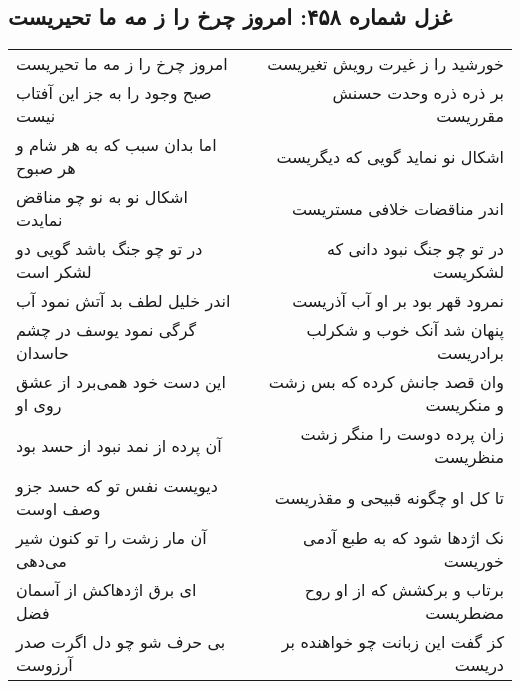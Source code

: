 \begin{center}
\section*{غزل شماره ۴۵۸: امروز چرخ را ز مه ما تحیریست}
\label{sec:0458}
\begin{longtable}{l p{0.5cm} r}
امروز چرخ را ز مه ما تحیریست
&&
خورشید را ز غیرت رویش تغیریست
\\
صبح وجود را به جز این آفتاب نیست
&&
بر ذره ذره وحدت حسنش مقرریست
\\
اما بدان سبب که به هر شام و هر صبوح
&&
اشکال نو نماید گویی که دیگریست
\\
اشکال نو به نو چو مناقض نمایدت
&&
اندر مناقضات خلافی مستریست
\\
در تو چو جنگ باشد گویی دو لشکر است
&&
در تو چو جنگ نبود دانی که لشکریست
\\
اندر خلیل لطف بد آتش نمود آب
&&
نمرود قهر بود بر او آب آذریست
\\
گرگی نمود یوسف در چشم حاسدان
&&
پنهان شد آنک خوب و شکرلب برادریست
\\
این دست خود همی‌برد از عشق روی او
&&
وان قصد جانش کرده که بس زشت و منکریست
\\
آن پرده از نمد نبود از حسد بود
&&
زان پرده دوست را منگر زشت منظریست
\\
دیویست نفس تو که حسد جزو وصف اوست
&&
تا کل او چگونه قبیحی و مقذریست
\\
آن مار زشت را تو کنون شیر می‌دهی
&&
نک اژدها شود که به طبع آدمی خوریست
\\
ای برق اژدهاکش از آسمان فضل
&&
برتاب و برکشش که از او روح مضطریست
\\
بی حرف شو چو دل اگرت صدر آرزوست
&&
کز گفت این زبانت چو خواهنده بر دریست
\\
\end{longtable}
\end{center}

